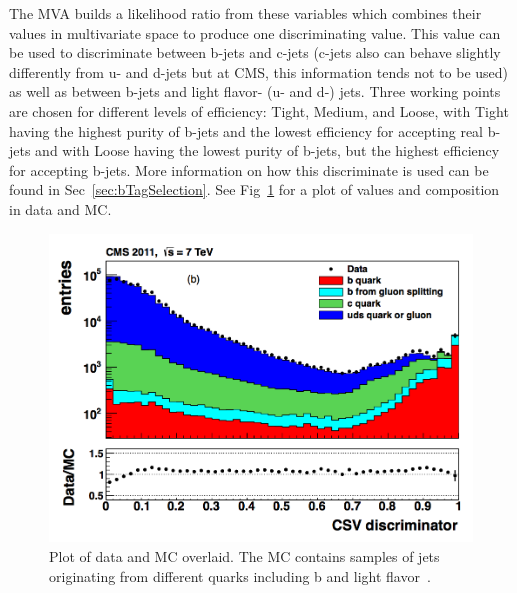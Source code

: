 	The MVA builds a likelihood ratio from these variables which combines their values in multivariate space to produce one discriminating value. This value can be used to discriminate between b-jets and c-jets (c-jets also can behave slightly differently from u- and d-jets but at CMS, this information tends not to be used) as well as between b-jets and light flavor- (u- and d-) jets. Three working points are chosen for different levels of efficiency: Tight, Medium, and Loose, with Tight having the highest purity of b-jets and the lowest efficiency for accepting real b-jets and with Loose having the lowest purity of b-jets, but the highest efficiency for accepting b-jets. More information on how this discriminate is used can be found in Sec~\ref{sec:bTagSelection}. See Fig~\ref{fig:csv_discriminant_values} for a plot of values and composition in data and MC.
	
	
\begin{figure}[h]
\begin{center}
\includegraphics[width=0.7\linewidth]{Figs/CSV_discriminator_values.png}
\caption{\label{fig:csv_discriminant_values}
Plot of data and MC overlaid. The MC contains samples of jets originating from different quarks including b and light flavor~\cite{btagging}.
}
\end{center}
\end{figure}
	
	
	
	
	
	
	
	
	
	